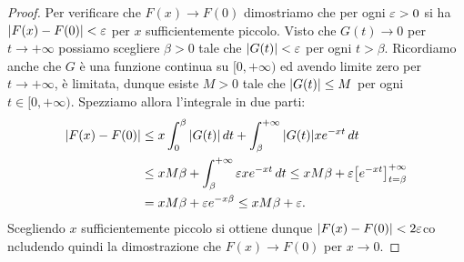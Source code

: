 \begin{proof}
Per verificare che $F(x)\to F(0)$ dimostriamo che per ogni $\varepsilon>0$ 
si ha ${\left|F(x)-F(0)\right|}<\varepsilon$ per $x$ sufficientemente piccolo.
Visto che $G(t)\to 0$ per $t\to +\infty$ possiamo scegliere $\beta>0$ tale che 
${\left|G(t)\right|}<\varepsilon$ per ogni $t>\beta$.
Ricordiamo anche che $G$ è una funzione continua su $[0,+\infty)$ 
ed avendo limite zero per $t\to +\infty$, è limitata, dunque esiste $M>0$ tale che ${\left|G(t)\right|}\le M$ 
per ogni $t\in [0,+\infty)$.
Spezziamo allora l'integrale in due parti:
\begin{align*}
  {\left|F(x) - F(0)\right|} 
  & \le x \int_0^\beta {\left|G(t)\right|}\, dt + \int_{\beta}^{+\infty} {\left|G(t)\right|} x e^{-xt}\, dt \\
  &\le x M \beta + \int_{\beta}^{+\infty} \varepsilon x e^{-xt}\, dt 
  \le x M \beta + \varepsilon {\left[ e^{-xt} \right]}_{t=\beta}^{+\infty} \\
  & = x M \beta + \varepsilon e^{-x\beta} \le x M \beta + \varepsilon.
\end{align*}
Scegliendo $x$ sufficientemente piccolo si ottiene dunque ${\left|F(x)-F(0)\right|}<2\varepsilon$co
ncludendo quindi la dimostrazione che $F(x)\to F(0)$ per $x\to 0$.  
\end{proof}

